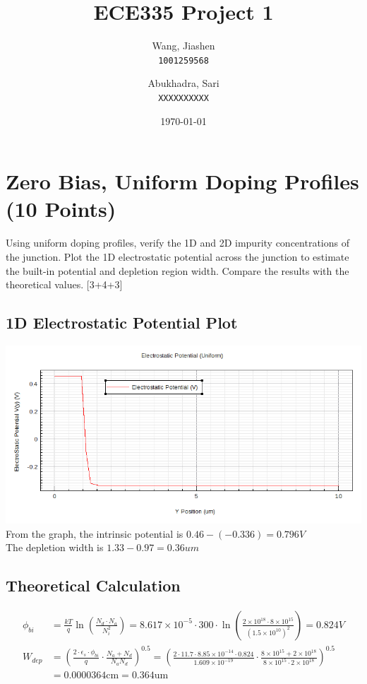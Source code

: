 \documentclass[12pt]{article}
\title{ECE335 Project 1}
\author{
  Wang, Jiashen\\
  \texttt{1001259568}
  \and
  Abukhadra, Sari\\
  \texttt{XXXXXXXXXX}
}
\date{\today}
\newcommand{\e}[1]{\times 10^{#1}}
\begin{document}
\vfill
\maketitle
\vfill

\newpage

\section{Zero Bias, Uniform Doping Profiles (10 Points)}

Using uniform doping profiles, verify the 1D and 2D impurity concentrations of the junction. Plot the 1D electrostatic potential across the junction to estimate the built-in potential and depletion region width. Compare the results with the theoretical values. [3+4+3]

\subsection{1D Electrostatic Potential Plot}
\includegraphics[width=\textwidth]{1a.png}
From the graph, the intrinsic potential is $0.46-(-0.336) = 0.796V$\\
The depletion width is $1.33 - 0.97 = 0.36um$
\subsection{Theoretical Calculation }
\begin{align*} 
\phi_{bi} &= \frac{kT}{q}\ln(\frac{N_d\cdot N_a}{N_i^2}) = 8.617\e{-5} \cdot 300\cdot \ln(\frac{2\e{18}\cdot8\e{15}}{(1.5\e{10})^2})=0.824V\\
W_{dep} &= (\frac{2\cdot \epsilon_{s}\cdot\phi_{bi}}{q}\cdot \frac{N_a+N_d}{N_a N_d})^{0.5}
= (\frac{2\cdot 11.7 \cdot 8.85\e{-14}\cdot 0.824}{1.609\e{-19}}\cdot \frac{8\e{15}+2\e{18}}{8\e{15} \cdot 2\e{18}})^{0.5}\\
&= 0.0000364 \text{cm} = 0.364 \text{um}
\end{align*}
\end{document}

